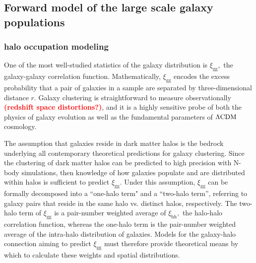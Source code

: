 \documentclass[12pt, preprint]{aastex}
\newcommand{\todo}[1]{{\bf \textcolor{red}{ #1}}}
\begin{document}
\subsection{Forward model of the large scale galaxy populations}\label{sec:halo}
\subsubsection{halo occupation modeling}

\newcommand{\lcdm}{\Lambda {\rm CDM}}
\newcommand{\dd}{\mathrm{d}}
\newcommand{\mean}[2]{\left\langle#1 \vert {#2}\right\rangle}

\newcommand{\ngal}{N_{\mathrm{g}}}
\newcommand{\nsat}{N_\mathrm{s}}
\newcommand{\ncen}{N_\mathrm{c}}
\newcommand{\pnm}[2]{P(#1|#2)}

\newcommand{\mhalo}{M_{\rm h}}
\newcommand{\mvir}{M_\mathrm{vir}} 

\newcommand{\dndmvir}{\frac{\dd n}{\dd\mvir}}
\newcommand{\dndmhalo}{\frac{\dd n}{\dd\mhalo}}
\newcommand{\dndmvirprime}{\frac{\dd n}{\dd\mvir'}}

\newcommand{\xigg}{\xi_{\mathrm{gg}}}
\newcommand{\xihh}{\xi_{\mathrm{hh}}}
\newcommand{\xiggr}{\xi_{\mathrm{gg}}(r)}
\newcommand{\xiggroneh}{\xi^{1h}_{\mathrm{gg}}(r)}
\newcommand{\xiggrtwoh}{\xi^{2h}_{\mathrm{gg}}(r)}
\newcommand{\ngalaxy}{\bar{n}_{\mathrm{g}}}

One of the most well-studied statistics of the galaxy distribution 
is $\xigg,$ the galaxy-galaxy correlation function. Mathematically, $\xigg$ encodes the
excess probability that a pair of galaxies in a sample are 
separated by three-dimensional distance $r.$ 
Galaxy clustering is straightforward to measure observationally \todo{(redshift space distortions?)}, 
and it is a highly sensitive probe of both the physics of galaxy evolution 
as well as the fundamental parameters of $\lcdm$ cosmology. 

The assumption that galaxies reside in dark matter halos is the bedrock underlying 
all contemporary theoretical predictions for galaxy clustering. Since the 
clustering of dark matter halos can be predicted to high precision with N-body simulations, 
then knowledge of how galaxies populate and are distributed within halos 
is sufficient to predict $\xigg.$ Under this assumption, $\xigg$ can be formally decomposed
into a ``one-halo term" and a ``two-halo term'', 
referring to galaxy pairs that reside in the same halo vs. distinct halos, respectively. 
The two-halo term of $\xigg$ is a pair-number weighted average of $\xihh,$ 
the halo-halo correlation function, whereas the one-halo term is the pair-number 
weighted average of the intra-halo distribution of galaxies. 
Models for the galaxy-halo connection aiming to predict $\xigg$ must therefore 
provide theoretical means by which to calculate these weights and spatial distributions. 
\end{document}
